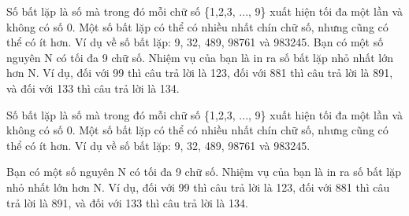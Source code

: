 Số bất lặp là số mà trong đó mỗi chữ số \{1,2,3, ..., 9\} xuất hiện tối đa một lần và không có số 0.       Một số bất lặp có thể có nhiều nhất chín chữ số, nhưng cũng có thể có ít hơn. Ví dụ về số bất lặp:       9, 32, 489, 98761 và 983245.       Bạn có một số nguyên N có tối đa 9 chữ số. Nhiệm vụ của bạn là in ra số bất lặp nhỏ nhất lớn       hơn N. Ví dụ, đối với 99 thì câu trả lời là 123, đối với 881 thì câu trả lời là 891, và đối với 133       thì câu trả lời là 134.    

   Số bất lặp là số mà trong đó mỗi chữ số \{1,2,3, ..., 9\} xuất hiện tối đa một lần và không có số 0. Một số bất lặp có thể có nhiều nhất chín chữ số, nhưng cũng có thể có ít hơn. Ví dụ về số bất lặp: 9, 32, 489, 98761 và 983245.  

   Bạn có một số nguyên N có tối đa 9 chữ số. Nhiệm vụ của bạn là in ra số bất lặp nhỏ nhất lớn hơn N. Ví dụ, đối với 99 thì câu trả lời là 123, đối với 881 thì câu trả lời là 891, và đối với 133 thì câu trả lời là 134.  



\
